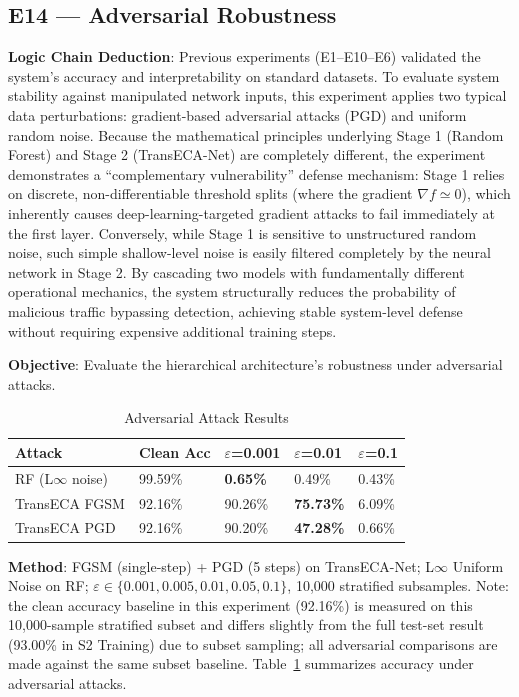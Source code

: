 \documentclass[sigconf]{acmart}
\begin{document}
\subsection{E14 --- Adversarial Robustness}
\textbf{Logic Chain Deduction}: Previous experiments (E1--E10--E6) validated the system's accuracy and interpretability on standard datasets. To evaluate system stability against manipulated network inputs, this experiment applies two typical data perturbations: gradient-based adversarial attacks (PGD) and uniform random noise. Because the mathematical principles underlying Stage 1 (Random Forest) and Stage 2 (TransECA-Net) are completely different, the experiment demonstrates a ``complementary vulnerability'' defense mechanism: Stage 1 relies on discrete, non-differentiable threshold splits (where the gradient $\nabla f \simeq 0$), which inherently causes deep-learning-targeted gradient attacks to fail immediately at the first layer. Conversely, while Stage 1 is sensitive to unstructured random noise, such simple shallow-level noise is easily filtered completely by the neural network in Stage 2. By cascading two models with fundamentally different operational mechanics, the system structurally reduces the probability of malicious traffic bypassing detection, achieving stable system-level defense without requiring expensive additional training steps.

\textbf{Objective}: Evaluate the hierarchical architecture's robustness under adversarial attacks.


\begin{table}[!t]
\caption{Adversarial Attack Results}
\label{tab:adversarial}
\begin{tabular}{lllll}
\toprule
\textbf{Attack} & \textbf{Clean Acc} & \textbf{$\varepsilon$=0.001} & \textbf{$\varepsilon$=0.01} & \textbf{$\varepsilon$=0.1} \\
\midrule
RF (L$\infty$ noise) & 99.59\% & \textbf{0.65\%} & 0.49\% & 0.43\% \\
TransECA FGSM & 92.16\% & 90.26\% & \textbf{75.73\%} & 6.09\% \\
TransECA PGD & 92.16\% & 90.20\% & \textbf{47.28\%} & 0.66\% \\
\bottomrule
\end{tabular}
\end{table}

\textbf{Method}: FGSM \cite{14} (single-step) + PGD \cite{17} (5 steps) on TransECA-Net; L$\infty$ Uniform Noise on RF; $\varepsilon \in \{0.001, 0.005, 0.01, 0.05, 0.1\}$, 10,000 stratified subsamples. Note: the clean accuracy baseline in this experiment (92.16\%) is measured on this 10,000-sample stratified subset and differs slightly from the full test-set result (93.00\% in S2 Training) due to subset sampling; all adversarial comparisons are made against the same subset baseline. Table~\ref{tab:adversarial} summarizes accuracy under adversarial attacks.
\end{document}
